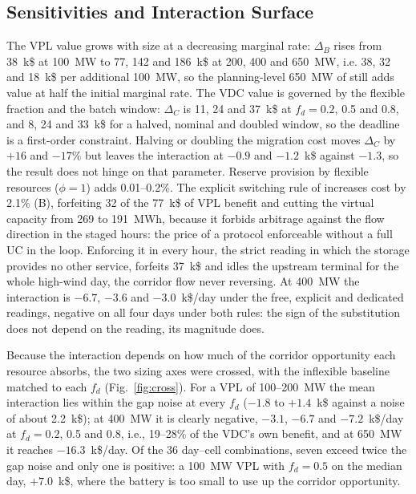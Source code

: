 \documentclass[conference]{IEEEtran}
\begin{document}
\subsection{Sensitivities and Interaction Surface}
The VPL value grows with size at a decreasing marginal rate: $\Delta_B$ rises from 38~k\$ at 100~MW to 77, 142 and 186~k\$ at 200, 400 and 650~MW, i.e. 38, 32 and 18~k\$ per additional 100~MW, so the planning-level 650~MW of \cite{ferreira2026} still adds value at half the initial marginal rate. The VDC value is governed by the flexible fraction and the batch window: $\Delta_C$ is 11, 24 and 37~k\$ at $f_d = 0.2$, 0.5 and 0.8, and 8, 24 and 33~k\$ for a halved, nominal and doubled window, so the deadline is a first-order constraint. Halving or doubling the migration cost moves $\Delta_C$ by $+16$ and $-17\%$ but leaves the interaction at $-0.9$ and $-1.2$~k\$ against $-1.3$, so the result does not hinge on that parameter. Reserve provision by flexible resources ($\phi=1$) adds 0.01--0.2\%. The explicit switching rule of \cite{ferreira2026} increases cost by 2.1\% (B), forfeiting 32 of the 77~k\$ of VPL benefit and cutting the virtual capacity from 269 to 191~MWh, because it forbids arbitrage against the flow direction in the staged hours: the price of a protocol enforceable without a full UC in the loop. Enforcing it in every hour, the strict reading in which the storage provides no other service, forfeits 37~k\$ and idles the upstream terminal for the whole high-wind day, the corridor flow never reversing. At 400~MW the interaction is $-6.7$, $-3.6$ and $-3.0$~k\$/day under the free, explicit and dedicated readings, negative on all four days under both rules: the sign of the substitution does not depend on the reading, its magnitude does.

Because the interaction depends on how much of the corridor opportunity each resource absorbs, the two sizing axes were crossed, with the inflexible baseline matched to each $f_d$ (Fig.~\ref{fig:cross}). For a VPL of 100--200~MW the mean interaction lies within the gap noise at every $f_d$ ($-1.8$ to $+1.4$~k\$ against a noise of about 2.2~k\$); at 400~MW it is clearly negative, $-3.1$, $-6.7$ and $-7.2$~k\$/day at $f_d = 0.2$, 0.5 and 0.8, i.e., 19--28\% of the VDC's own benefit, and at 650~MW it reaches $-16.3$~k\$/day. Of the 36 day--cell combinations, seven exceed twice the gap noise and only one is positive: a 100~MW VPL with $f_d = 0.5$ on the median day, $+7.0$~k\$, where the battery is too small to use up the corridor opportunity.
\end{document}
